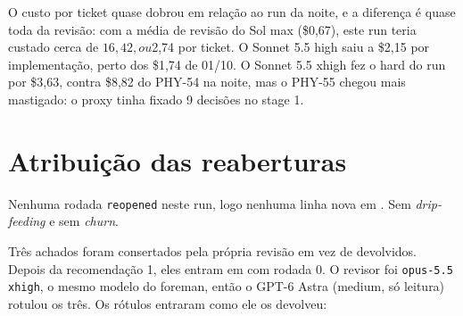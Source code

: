 \documentclass[11pt,a4paper]{article}
\begin{document}
\medskip
{}

\medskip
O custo por ticket quase dobrou em relação ao run da noite, e a diferença é
quase toda da revisão: com a média de revisão do Sol max (\$0,67), este run
teria custado cerca de $16,42, ou $2,74 por ticket. O Sonnet 5.5 high saiu a
\$2,15 por implementação, perto dos \$1,74 de 01/10. O Sonnet 5.5 xhigh fez o
hard do run por \$3,63, contra \$8,82 do PHY-54 na noite, mas o PHY-55 chegou
mais mastigado: o proxy tinha fixado 9 decisões no stage 1.

\section{Atribuição das reaberturas}

Nenhuma rodada \texttt{reopened} neste run, logo nenhuma linha nova em
. Sem \emph{drip-feeding} e sem
\emph{churn}.

Três achados foram consertados pela própria revisão em vez de devolvidos.
Depois da recomendação 1, eles entram em 
com rodada 0. O revisor foi \texttt{opus-5.5 xhigh}, o mesmo modelo do foreman,
então o GPT-6 Astra (medium, só leitura) rotulou os três. Os rótulos entraram
como ele os devolveu:
\end{document}
